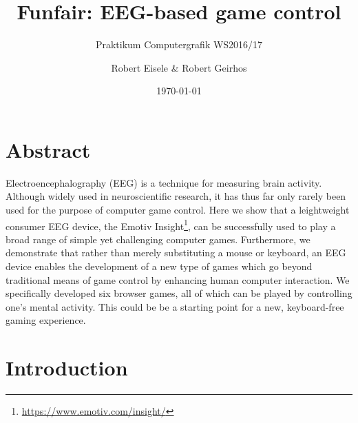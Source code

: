 \documentclass{utue} %
\title{Funfair: EEG-based game control}
\author{Robert Eisele \& Robert Geirhos}
\date{\today}
\subtitle{Praktikum Computergrafik WS2016/17}
\begin{document}

\maketitle

\section*{Abstract}


Electroencephalography (EEG) is a technique for measuring brain activity. Although widely used in neuroscientific research, it has thus far only rarely been used for the purpose of computer game control. Here we show that a leightweight consumer EEG device, the Emotiv Insight\footnote{\url{https://www.emotiv.com/insight/}}, can be successfully used to play a broad range of simple yet challenging computer games. Furthermore, we demonstrate that rather than merely substituting a mouse or keyboard, an EEG device enables the development of a new type of games which go beyond traditional means of game control by enhancing human computer interaction. We specifically developed six browser games, all of which can be played by controlling one's mental activity. This could be be a starting point for a new, keyboard-free gaming experience.




\section{Introduction}
\end{document}
